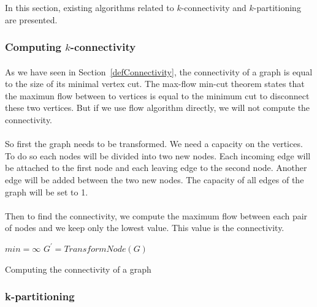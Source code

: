 In this section, existing algorithms related to
$k$-connectivity and $k$-partitioning are presented.

\subsubsection{Computing $k$-connectivity}
\paragraph{}
As we have seen in Section~\ref{defConnectivity}, the connectivity of a graph is equal to
the size of its minimal vertex cut. The max-flow min-cut theorem states
that the maximun flow between to vertices is equal to the minimum cut to 
disconnect these two vertices. But if we use flow algorithm directly, 
we will not compute the connectivity.

\paragraph{}
So first the graph needs to be transformed. We need a capacity on the vertices.
To do so each nodes will be divided into two new nodes. Each incoming edge will
be attached to the first node and each leaving edge to the second node. Another
edge will be added between the two new nodes.
The capacity of all edges of the graph will be set to 1.

\paragraph{}
Then to find the connectivity, we compute the maximum flow between each pair of
nodes and we keep only the lowest value. This value is the connectivity.


\begin{algorithm}[!h]
    $min = \infty$\;
    $G^{'} = TransformNode(G)$\;
    \;
    \caption{Computing the connectivity of a graph}
\end{algorithm}

\subsubsection{k-partitioning}

